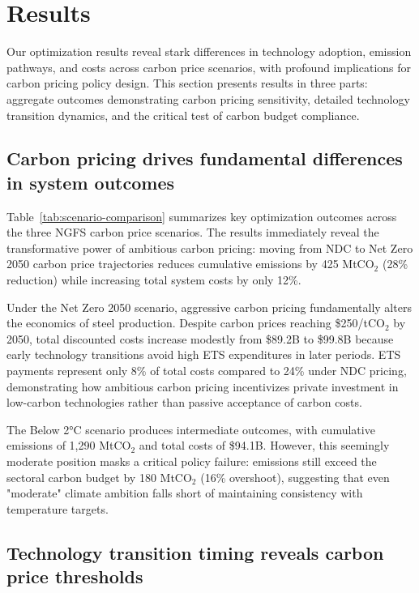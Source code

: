 \documentclass[preprint,5p,authoryear]{elsarticle}
\begin{document}
\section{Results}

Our optimization results reveal stark differences in technology adoption, emission pathways, and costs across carbon price scenarios, with profound implications for carbon pricing policy design. This section presents results in three parts: aggregate outcomes demonstrating carbon pricing sensitivity, detailed technology transition dynamics, and the critical test of carbon budget compliance.

\subsection{Carbon pricing drives fundamental differences in system outcomes}

Table~\ref{tab:scenario-comparison} summarizes key optimization outcomes across the three NGFS carbon price scenarios. The results immediately reveal the transformative power of ambitious carbon pricing: moving from NDC to Net Zero 2050 carbon price trajectories reduces cumulative emissions by 425 MtCO$_2$ (28\% reduction) while increasing total system costs by only 12\%.

Under the Net Zero 2050 scenario, aggressive carbon pricing fundamentally alters the economics of steel production. Despite carbon prices reaching \$250/tCO$_2$ by 2050, total discounted costs increase modestly from \$89.2B to \$99.8B because early technology transitions avoid high ETS expenditures in later periods. ETS payments represent only 8\% of total costs compared to 24\% under NDC pricing, demonstrating how ambitious carbon pricing incentivizes private investment in low-carbon technologies rather than passive acceptance of carbon costs.

The Below 2°C scenario produces intermediate outcomes, with cumulative emissions of 1,290 MtCO$_2$ and total costs of \$94.1B. However, this seemingly moderate position masks a critical policy failure: emissions still exceed the sectoral carbon budget by 180 MtCO$_2$ (16\% overshoot), suggesting that even "moderate" climate ambition falls short of maintaining consistency with temperature targets.

\subsection{Technology transition timing reveals carbon price thresholds}
\end{document}
